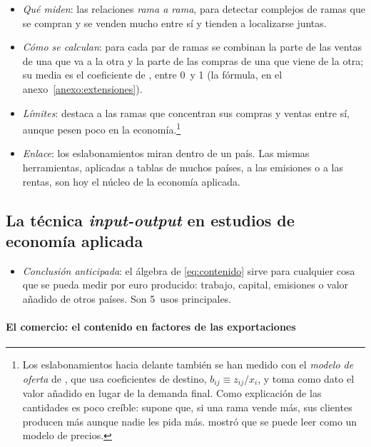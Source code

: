 \documentclass[11pt]{article}
\begin{document}
\begin{itemize}
\item \emph{Qué miden}: las relaciones \emph{rama a rama}, para detectar complejos de ramas que se compran y se venden mucho entre sí y tienden a localizarse juntas\nocite{Streit1969Spatial}.
\item \emph{Cómo se calculan}: para cada par de ramas se combinan la parte de las ventas de una que va a la otra y la parte de las compras de una que viene de la otra; su media es el coeficiente de , entre 0~y 1 (la fórmula, en el anexo~\ref{anexo:extensiones}).
\item \emph{Límites}: destaca a las ramas que concentran sus compras y ventas entre sí, aunque pesen poco en la economía.\footnote{Los eslabonamientos hacia delante también se han medido con el \emph{modelo de oferta} de \textcite{Ghosh1958Input}, que usa coeficientes de destino, $b_{ij}\equiv z_{ij}/x_i$, y toma como dato el valor añadido en lugar de la demanda final. Como explicación de las cantidades es poco creíble: supone que, si una rama vende más, sus clientes producen más aunque nadie les pida más\nocite{Oosterhaven1988}. \textcite{Dietzenbacher1997} mostró que se puede leer como un modelo de precios.}
\end{itemize}

\begin{itemize}
\item \emph{Enlace}: los eslabonamientos miran dentro de un país. Las mismas herramientas, aplicadas a tablas de muchos países, a las emisiones o a las rentas, son hoy el núcleo de la economía aplicada.
\end{itemize}

\subsection{La técnica \emph{input-output} en estudios de economía aplicada}\label{sec:economia-aplicada}

\begin{itemize}
\item \emph{Conclusión anticipada}: el álgebra de \eqref{eq:contenido} sirve para cualquier cosa que se pueda medir por euro producido: trabajo, capital, emisiones o valor añadido de otros países. Son 5~usos principales.
\end{itemize}

\paragraph{El comercio: el contenido en factores de las exportaciones}
\end{document}
